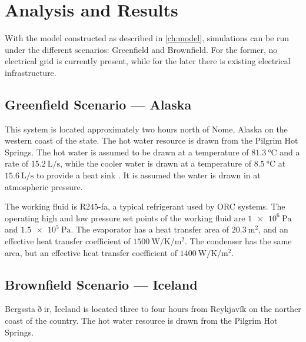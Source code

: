 \chapter{Analysis and Results}
\label{ch:analysis}

With the model constructed as described in \autoref{ch:model}, simulations can be run under the different scenarios: Greenfield and Brownfield. For the former, no electrical grid is currently present, while for the later there is existing electrical infrastructure.

\section{Greenfield Scenario --- Alaska}
This system is located approximately two hours north of Nome, Alaska on the western coast of the state. The hot water resource is drawn from the Pilgrim Hot Springs. The hot water is assumed to be drawn at a temperature of $\SI{81.3}{\degreeCelsius}$ and a rate of $\SI{15.2}{\liter\per\second}$, while the cooler water is drawn at a temperature of $\SI{8.5}{\degreeCelsius}$ at $\SI{15.6}{\liter\per\second}$ to provide a heat sink \cite{Haselwimmer2013}. It is assumed the water is drawn in at atmospheric pressure.

The working fluid is R245-fa, a typical refrigerant used by ORC systems. The operating high and low pressure set points of the working fluid are $\SI{1e6}{\pascal}$ and $\SI{1.5e5}{\pascal}$. The evaporator has a heat transfer area of $\SI{20.3}{\meter\squared}$, and an effective heat transfer coefficient of $\SI{1500}{\watt\per\kelvin\per\meter\squared}$. The condenser has the same area, but an effective heat transfer coefficient of $\SI{1400}{\watt\per\kelvin\per\meter\squared}$.

\section{Brownfield Scenario --- Iceland}
Bergssta$\eth$ir, Iceland is located three to four hours from Reykjavík on the norther coast of the country. The hot water resource is drawn from the Pilgrim Hot Springs.
